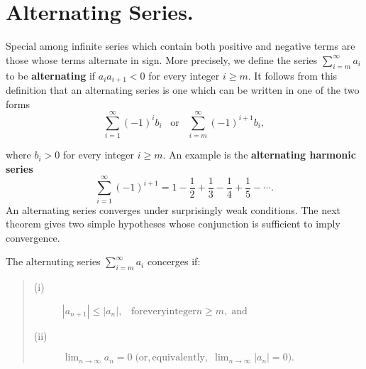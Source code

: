 \section{Alternating Series.} 
Special among infinite series which contain both positive and negative terms are those whose terms alternate in sign. More precisely, we define the series $\sum_{i=m}^\infty a_i$ to be \textbf{alternating} if $a_{i}a_{i+1} < 0$ for every integer $i \geq m$. It follows from this definition that an alternating series is one which can be written in one of the two forms
$$
\sum_{i=1}^\infty  (-1)^{i}b_{i}\;\;\; \mbox{or} \;\;\;  \sum_{i=m}^\infty (-1)^{i+1}b_{i},
$$

\noindent where $b_i > 0$ for every integer $i \geq m$. An example is the \textbf{alternating harmonic series}
$$
\sum_{i=1}^\infty  (-1)^{i+1} = 1 - \frac{1}{2} + \frac{1}{3} - \frac{1}{4} + \frac{1}{5} - \cdots .
$$
An alternating series converges under surprisingly weak conditions. The next theorem gives two simple hypotheses whose conjunction is sufficient to imply convergence.

\begin{theorem} %
The alternuting series $\sum_{i=m}^\infty a_i$ concerges if:

\begin{quote}
\begin{description}
\item[(i)]  $|a_{n + 1}| \leq |a_n|, \;\;\; \mathrm{for every integer} n \geq m, \;\mathrm{and}$ 
\item[(ii)] $\lim_{n \rightarrow \infty} a_n = 0 \;\mathrm{(or, equivalently,} \; \lim_{n \rightarrow \infty} |a_n| = 0).$
\end{description}
\end{quote}
\end{theorem}

